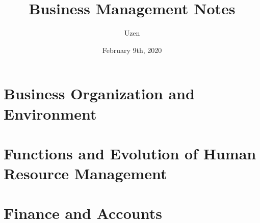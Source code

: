 \documentclass{report}
\title{Business Management Notes}
\author{Uzen}
\date{February 9th, 2020}
\begin{document}
\maketitle
\newpage

\tableofcontents
\newpage

\chapter{Business Organization and Environment}

\chapter{Functions and Evolution of Human Resource Management}


\chapter{Finance and Accounts}

\end{document}

